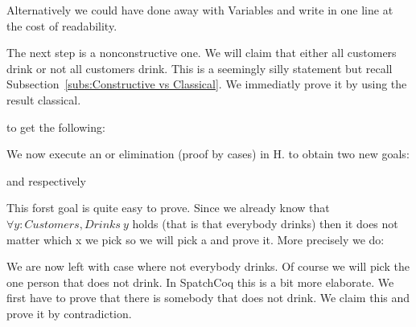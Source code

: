 Alternatively we could have done away with Variables and write in one line at the cost of readability.


The next step is a nonconstructive one. We will claim that either all customers drink or not all customers drink. This is a seemingly silly statement but recall Subsection~\ref{subs:Constructive vs Classical}. We immediatly prove it by using the result classical.


to get the following:



We now execute an or elimination (proof by cases) in H.
to obtain two new goals:




and respectively


This forst goal is quite easy to prove. Since we already know that $\forall y : Customers, Drinks\  y$ holds (that is that everybody drinks) then it does not matter which x we pick so we will pick a and prove it. More precisely we do:



We are now left with case where not everybody drinks. Of course we will pick the one person that does not drink. In SpatchCoq this is a bit more elaborate. We first have to prove that there is somebody that does not drink. We claim this and prove it by contradiction.



